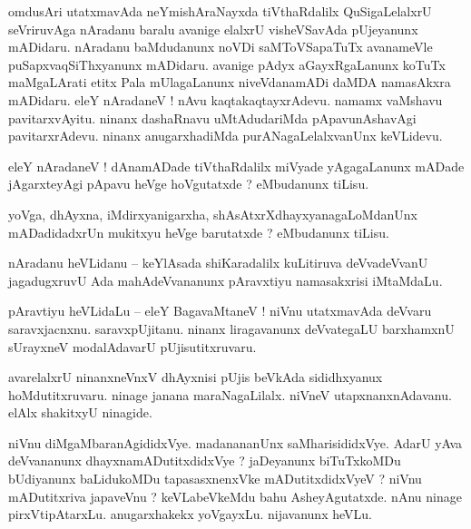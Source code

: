 \documentclass{article}
\begin{document}
\begin{mn}%
omdusAri utatxmavAda neYmishAraNayxda tiVthaRdalilx QuSigaLelalxrU seVriruvAga nAradanu baralu 
avanige elalxrU visheVSavAda pUjeyanunx mADidaru. nAradanu baMdudanunx noVDi saMToVSapaTuTx 
avanameVle puSapxvaqSiThxyanunx mADidaru. avanige pAdyx aGayxRgaLanunx koTuTx maMgaLArati etitx 
Pala mUlagaLanunx niveVdanamADi daMDA namasAkxra mADidaru. eleY nAradaneV ! nAvu 
kaqtakaqtayxrAdevu. namamx vaMshavu pavitarxvAyitu. ninanx dashaRnavu uMtAdudariMda 
pApavunAshavAgi pavitarxrAdevu. ninanx anugarxhadiMda purANagaLelalxvanUnx keVLidevu.
\end{mn}

\begin{mn}%
eleY nAradaneV ! dAnamADade tiVthaRdalilx miVyade yAgagaLanunx mADade jAgarxteyAgi pApavu heVge 
hoVgutatxde ? eMbudanunx tiLisu.
\end{mn}

\begin{mn}%
yoVga, dhAyxna, iMdirxyanigarxha, shAsAtxrXdhayxyanagaLoMdanUnx mADadidadxrUn mukitxyu heVge 
barutatxde ? eMbudanunx tiLisu.
\end{mn}

\begin{mn}%
nAradanu heVLidanu -- keYlAsada shiKaradalilx kuLitiruva deVvadeVvanU jagadugxruvU Ada 
mahAdeVvananunx pAravxtiyu namasakxrisi iMtaMdaLu.
\end{mn}

\begin{mn}%
pAravtiyu heVLidaLu -- eleY BagavaMtaneV ! niVnu utatxmavAda deVvaru saravxjacnxnu. saravxpUjitanu. 
ninanx liragavanunx deVvategaLU barxhamxnU sUrayxneV modalAdavarU pUjisutitxruvaru.
\end{mn}

\begin{mn}%
avarelalxrU ninanxneVnxV dhAyxnisi pUjis beVkAda sididhxyanux hoMdutitxruvaru. ninage janana 
maraNagaLilalx. niVneV utapxnanxnAdavanu. elAlx shakitxyU ninagide.
\end{mn}

\begin{mn}%
niVnu diMgaMbaranAgididxVye. madanananUnx saMharisididxVye. AdarU yAva deVvananunx 
dhayxnamADutitxdidxVye ? jaDeyanunx biTuTxkoMDu bUdiyanunx baLidukoMDu tapasasxnenxVke 
mADutitxdidxVyeV ? niVnu mADutitxriva japaveVnu ? keVLabeVkeMdu bahu AsheyAgutatxde. nAnu ninage 
pirxVtipAtarxLu. anugarxhakekx yoVgayxLu. nijavanunx heVLu.
\end{mn}
\end{document}
